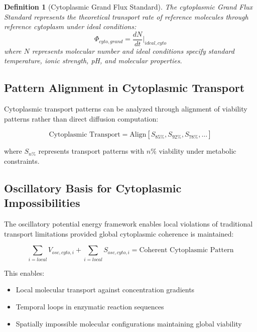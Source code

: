 \documentclass[12pt,a4paper]{article}
\newtheorem{definition}{Definition}
\begin{document}
\begin{definition}[Cytoplasmic Grand Flux Standard]
The cytoplasmic Grand Flux Standard represents the theoretical transport rate of reference molecules through reference cytoplasm under ideal conditions:
\begin{equation}
\Phi_{cyto,grand} = \frac{dN}{dt}\bigg|_{ideal,cyto}
\end{equation}
where $N$ represents molecular number and ideal conditions specify standard temperature, ionic strength, pH, and molecular properties.
\end{definition}

\subsection{Pattern Alignment in Cytoplasmic Transport}

Cytoplasmic transport patterns can be analyzed through alignment of viability patterns rather than direct diffusion computation:

\begin{equation}
\text{Cytoplasmic Transport} = \text{Align}[S_{85\%}, S_{92\%}, S_{78\%}, \ldots]
\end{equation}

where $S_{n\%}$ represents transport patterns with $n\%$ viability under metabolic constraints.

\subsection{Oscillatory Basis for Cytoplasmic Impossibilities}

The oscillatory potential energy framework enables local violations of traditional transport limitations provided global cytoplasmic coherence is maintained:

\begin{equation}
\sum_{i=local} V_{osc,cyto,i} + \sum_{i=local} S_{osc,cyto,i} = \text{Coherent Cytoplasmic Pattern}
\end{equation}

This enables:
\begin{itemize}
\item Local molecular transport against concentration gradients
\item Temporal loops in enzymatic reaction sequences
\item Spatially impossible molecular configurations maintaining global viability
\end{itemize}
\end{document}
